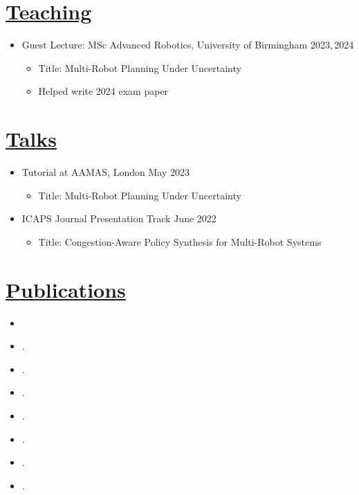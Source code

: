 \documentclass[11pt]{article}
\begin{document}
\section*{\underline{Teaching}}
\begin{itemize}
\item Guest Lecture: MSc Advanced Robotics, University of Birmingham \hfill  2023,\,2024
\begin{itemize}
\item Title: Multi-Robot Planning Under Uncertainty
\item Helped write 2024 exam paper
\end{itemize}
\end{itemize}

\section*{\underline{Talks}}
\begin{itemize}
\item Tutorial at AAMAS, London \hfill May 2023
\begin{itemize}
\item Title: Multi-Robot Planning Under Uncertainty
\end{itemize}
\item ICAPS Journal Presentation Track \hfill June 2022
\begin{itemize}
\item Title: Congestion-Aware Policy Synthesis for Multi-Robot Systems
\end{itemize}
\end{itemize}

\section*{\underline{Publications}}
\begin{itemize}
\item[\cite{street2024right}] 
\item[\cite{street2023formal}] .
\item[\cite{zhang2023multi}] .
\item[\cite{street2023analysing}] .
\item[\cite{lacerda2022decision}] .
\item[\cite{street2022context}] .
\item[\cite{street2021congestion}] .	
\item[\cite{street2020multi}] .
\end{itemize}
\end{document}
